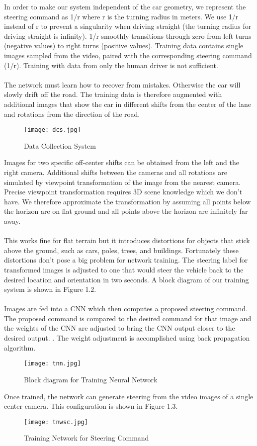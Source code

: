  In order to make our system independent of the car geometry, we represent the steering command as 1/r where r is the turning radius in meters. We use 1/r instead of r to prevent a singularity when driving straight (the turning radius for driving straight is infinity). 1/r smoothly transitions through zero from left turns (negative values) to right turns (positive values). Training data contains single images sampled from the video, paired with the corresponding steering command (1/r). Training with data from only the human driver is not sufficient.\\\\
 The network must learn how to recover from mistakes. Otherwise the car will slowly drift off the road. The training data is therefore augmented with additional images that show the car in different shifts from the center of the lane and rotations from the direction of the road.\\

\begin{figure}[H]
	\centering
	\texttt{[image: dcs.jpg]}
	\caption{Data Collection System}
\end{figure}

Images for two specific off-center shifts can be obtained from the left and the right camera. Additional shifts between the cameras and all rotations are simulated by viewpoint transformation of the image from the nearest camera. Precise viewpoint transformation requires 3D scene knowledge which we don’t have. We therefore approximate the transformation by assuming all points below the horizon are on flat ground and all points above the horizon are infinitely far away.\\\\
This works fine for flat terrain but it introduces distortions for objects that stick above the ground, such as cars, poles, trees, and buildings. Fortunately these distortions don’t pose a big problem for network training. The steering label for transformed images is adjusted to one that would steer the vehicle back to the desired location and orientation in two seconds. A block diagram of our training system is shown in Figure 1.2.\\\\
Images are fed into a CNN which then computes a proposed steering command. The proposed command is compared to the desired command for that image and the weights of the CNN are adjusted to bring the CNN output closer to the desired output. . The weight adjustment is accomplished using back propagation algorithm.
\begin{figure}[H]
	\centering
	\texttt{[image: tnn.jpg]}
	\caption{Block diagram for Training Neural Network}
\end{figure}
Once trained, the network can generate steering from the video images of a single center camera. This configuration is shown in Figure 1.3.
\begin{figure}[H]
	\centering
	\texttt{[image: tnwsc.jpg]}
	\caption{Training Network for Steering Command}
\end{figure}

